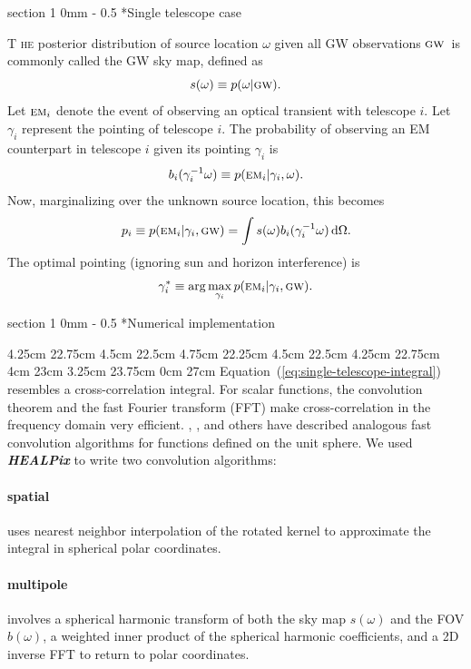 \documentclass[landscape]{a0poster}
\makeatletter
\newcommand{\EM}[1]{\ensuremath{\textsc{\textrm{em}}_#1}}
\newcommand{\GW}{\ensuremath{\textsc{\textrm{gw}}}}
\newcommand{\dropcap}[2]{\lettrine{\fontspec{Copse}#1}{\textnormal{ #2}}}
\renewcommand{\section}{\@startsection
{section}%
{1}%
{0mm}%
{-\baselineskip}%
{0.5\baselineskip}%
{\fontspec{Marvel Bold}\Huge}} %
\renewcommand{\emph}[1]{{\bfseries\itshape#1}}
\makeatother
\begin{document}
\section*{Single telescope case}

\dropcap{T}{he} posterior distribution of source location $\omega$ given all GW observations \GW\ is commonly called the GW sky map, defined as
%
$$
	s(\omega) \equiv p(\omega | \GW).
$$
%
Let $\EM{i}$ denote the event of observing an optical transient with telescope $i$.  Let $\gamma_i$ represent the pointing of telescope $i$.  The probability of observing an EM counterpart in telescope $i$ given its pointing $\gamma_i$ is
%
$$
	b_i(\gamma_i^{-1} \omega) \equiv p(\EM{i} | \gamma_i, \omega).
$$
%
Now, marginalizing over the unknown source location, this becomes
%
\begin{equation}
	\label{eq:single-telescope-integral}
	p_i \equiv p (\EM{i} | \gamma_i, \GW) = \int s(\omega) b_i(\gamma_i^{-1} \omega) \, \mathrm{d}\Omega.
\end{equation}
%
The optimal pointing (ignoring sun and horizon interference) is
%
$$
	\gamma_i^* \equiv \arg \max_{\gamma_i} p(\EM{i} | \gamma_i, \GW).
$$

\framebreak

\section*{\hspace{3cm}Numerical implementation}

	4.25cm 22.75cm
	4.5cm 22.5cm
	4.75cm 22.25cm
	4.5cm 22.5cm
	4.25cm 22.75cm
	4cm 23cm
	3.25cm 23.75cm
	0cm 27cm  
Equation~(\ref{eq:single-telescope-integral}) resembles a cross-correlation integral.  For scalar functions, the convolution theorem and the fast Fourier transform (FFT) make cross-correlation in the frequency domain very efficient.  \citet{Driscoll1994202}, \citet{Wandelt:2001p13439}, and others have described analogous fast convolution algorithms for functions defined on the unit sphere.  We used \emph{HEALPix} to write two convolution algorithms:

\paragraph{spatial}
uses nearest neighbor interpolation of the rotated kernel to approximate the integral in spherical polar coordinates.

\paragraph{multipole}
involves a spherical harmonic transform of both the sky map $s(\omega)$ and the FOV $b(\omega)$, a weighted inner product of the spherical harmonic coefficients, and a 2D inverse FFT to return to polar coordinates.\\
\end{document}
